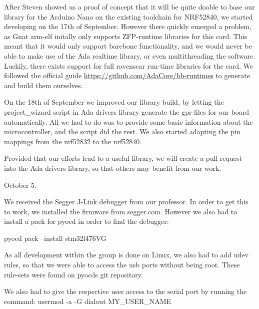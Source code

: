 \documentclass{article}
\begin{document}
\vspace{5mm}
After Steven showed us a proof of concept that it will be quite doable to base our library for the Arduino Nano on the existing toolchain for NRF52840, we started developing on the 17th of September. However there quickly emerged a problem, as Gnat arm-elf initally only supports ZFP-runtime libraries for this card. This meant that it would only support barebone functionality, and we would never be able to make use of the Ada realtime library, or even multithreading the software. Luckily, there exists support for full ravenscar run-time libraries for the card. We followed the official guide \url{https://github.com/AdaCore/bb-runtimes} \cite{BBRUNTIMES} to generate and build them ourselves.


\vspace{5mm}
On the 18th of September we improved our library build, by letting the project\_wizard script in Ada drivers library generate the gpr-files for our board automatically. All we had to do was to provide some basic information about the microcontroller, and the script did the rest. We also started adapting the pin mappings from the nrf52832 to the nrf52840. 

Provided that our efforts lead to a useful library, we will create a pull request into the Ada drivers library, so that others may benefit from our work. 


\vspace{5mm}

October 5. 

We received the Segger J-Link debugger from our professor. In order to get this to work, we installed the firmware from segger.com. However we also had to install a pack for pyocd in order to find the debugger:

pyocd pack --install  stm32l476VG

As all development within the group is done on Linux, we also had to add udev rules, so that we were able to access the usb ports without being root. These rule-sets were found on pyocds git repository.

We also had to give the respective user access to the serial port by running the command: 
usermod -a -G dialout MY\_USER\_NAME
\end{document}
